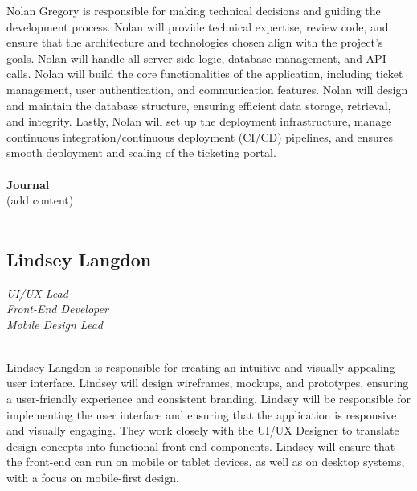 \documentclass[oneside,openany,obeyspaces]{book}
\newcommand\tab[1][1cm]{\hspace*{#1}}
\begin{document}
\begin{flushleft}
    \tab Nolan Gregory is responsible for making technical decisions and guiding the development process. Nolan will provide technical expertise, review code, and ensure that the architecture and technologies chosen align with the project's goals. Nolan will handle all server-side logic, database management, and API calls. Nolan will build the core functionalities of the application, including ticket management, user authentication, and communication features. Nolan will design and maintain the database structure, ensuring efficient data storage, retrieval, and integrity. Lastly, Nolan will set up the deployment infrastructure, manage continuous integration/continuous deployment (CI/CD) pipelines, and ensures smooth deployment and scaling of the ticketing portal.\\~\\

    \textbf{Journal\\}
    (add content)\\~\\

    \subsection{Lindsey Langdon}

    \textit{UI/UX Lead\\
        Front-End Developer\\
        Mobile Design Lead\\~\\}

    \tab Lindsey Langdon is responsible for creating an intuitive and visually appealing user interface. Lindsey will design wireframes, mockups, and prototypes, ensuring a user-friendly experience and consistent branding. Lindsey will be responsible for implementing the user interface and ensuring that the application is responsive and visually engaging. They work closely with the UI/UX Designer to translate design concepts into functional front-end components. Lindsey will ensure that the front-end can run on mobile or tablet devices, as well as on desktop systems, with a focus on mobile-first design.\\~\\


\end{flushleft}
\end{document}
